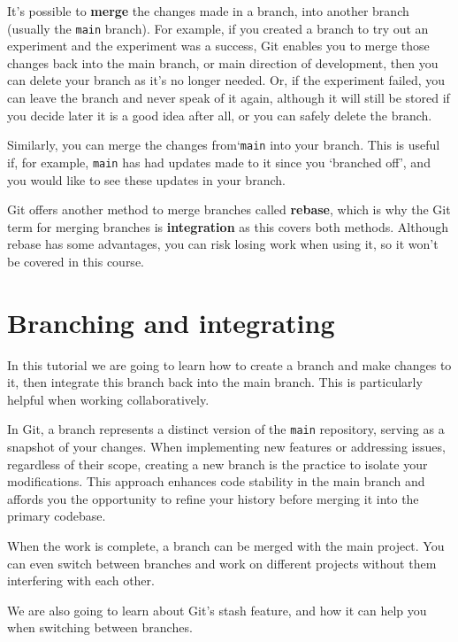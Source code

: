 \documentclass[
  letterpaper,
  DIV=11,
  numbers=noendperiod]{scrartcl}
\begin{document}
It's possible to \textbf{merge} the changes made in a branch, into
another branch (usually the \texttt{main} branch). For example, if you
created a branch to try out an experiment and the experiment was a
success, Git enables you to merge those changes back into the main
branch, or main direction of development, then you can delete your
branch as it's no longer needed. Or, if the experiment failed, you can
leave the branch and never speak of it again, although it will still be
stored if you decide later it is a good idea after all, or you can
safely delete the branch.

Similarly, you can merge the changes from`\texttt{main} into your
branch. This is useful if, for example, \texttt{main} has had updates
made to it since you `branched off', and you would like to see these
updates in your branch.

Git offers another method to merge branches called \textbf{rebase},
which is why the Git term for merging branches is \textbf{integration}
as this covers both methods. Although rebase has some advantages, you
can risk losing work when using it, so it won't be covered in this
course.

\hypertarget{branching-and-integrating-1}{%
\section{Branching and integrating}\label{branching-and-integrating-1}}

In this tutorial we are going to learn how to create a branch and make
changes to it, then integrate this branch back into the main branch.
This is particularly helpful when working collaboratively.

In Git, a branch represents a distinct version of the \texttt{main}
repository, serving as a snapshot of your changes. When implementing new
features or addressing issues, regardless of their scope, creating a new
branch is the practice to isolate your modifications. This approach
enhances code stability in the main branch and affords you the
opportunity to refine your history before merging it into the primary
codebase.

When the work is complete, a branch can be merged with the main project.
You can even switch between branches and work on different projects
without them interfering with each other.

We are also going to learn about Git's stash feature, and how it can
help you when switching between branches.
\end{document}

